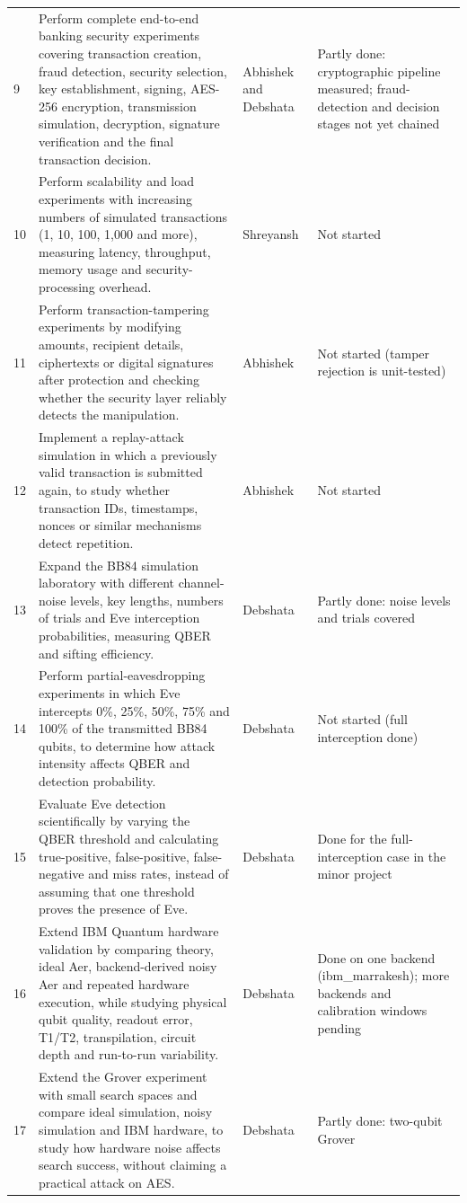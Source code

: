 \begin{longtable}{@{}p{0.6cm}p{7.2cm}p{2.0cm}p{3.2cm}@{}}
9 & Perform complete end-to-end banking security experiments covering transaction creation, fraud detection, security selection, key establishment, signing, AES-256 encryption, transmission simulation, decryption, signature verification and the final transaction decision. & Abhishek and Debshata & Partly done: cryptographic pipeline measured; fraud-detection and decision stages not yet chained\\
10 & Perform scalability and load experiments with increasing numbers of simulated transactions (1, 10, 100, 1,000 and more), measuring latency, throughput, memory usage and security-processing overhead. & Shreyansh & Not started\\
11 & Perform transaction-tampering experiments by modifying amounts, recipient details, ciphertexts or digital signatures after protection and checking whether the security layer reliably detects the manipulation. & Abhishek & Not started (tamper rejection is unit-tested)\\
12 & Implement a replay-attack simulation in which a previously valid transaction is submitted again, to study whether transaction IDs, timestamps, nonces or similar mechanisms detect repetition. & Abhishek & Not started\\
13 & Expand the BB84 simulation laboratory with different channel-noise levels, key lengths, numbers of trials and Eve interception probabilities, measuring QBER and sifting efficiency. & Debshata & Partly done: noise levels and trials covered\\
14 & Perform partial-eavesdropping experiments in which Eve intercepts 0\%, 25\%, 50\%, 75\% and 100\% of the transmitted BB84 qubits, to determine how attack intensity affects QBER and detection probability. & Debshata & Not started (full interception done)\\
15 & Evaluate Eve detection scientifically by varying the QBER threshold and calculating true-positive, false-positive, false-negative and miss rates, instead of assuming that one threshold proves the presence of Eve. & Debshata & Done for the full-interception case in the minor project\\
16 & Extend IBM Quantum hardware validation by comparing theory, ideal Aer, backend-derived noisy Aer and repeated hardware execution, while studying physical qubit quality, readout error, T1/T2, transpilation, circuit depth and run-to-run variability. & Debshata & Done on one backend (ibm\_marrakesh); more backends and calibration windows pending\\
17 & Extend the Grover experiment with small search spaces and compare ideal simulation, noisy simulation and IBM hardware, to study how hardware noise affects search success, without claiming a practical attack on AES. & Debshata & Partly done: two-qubit Grover\\

\end{longtable}
